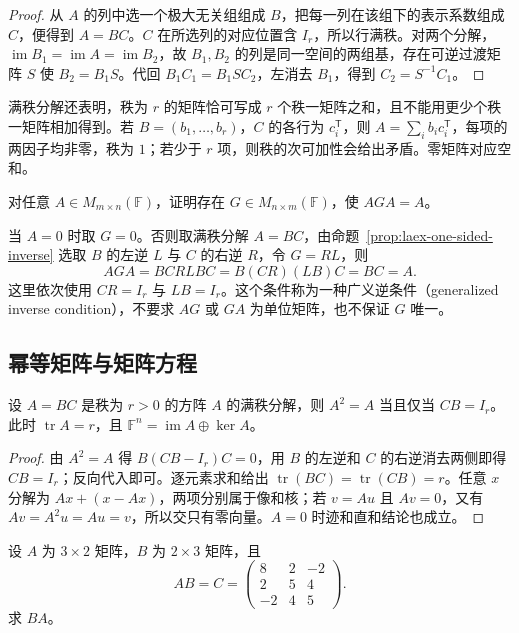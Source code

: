 \begin{proof}
从 $A$ 的列中选一个极大无关组组成 $B$，把每一列在该组下的表示系数组成 $C$，便得到 $A=BC$。$C$ 在所选列的对应位置含 $I_r$，所以行满秩。对两个分解，$\operatorname{im}B_1=\operatorname{im}A=\operatorname{im}B_2$，故 $B_1,B_2$ 的列是同一空间的两组基，存在可逆过渡矩阵 $S$ 使 $B_2=B_1S$。代回 $B_1C_1=B_1SC_2$，左消去 $B_1$，得到 $C_2=S^{-1}C_1$。
\end{proof}

满秩分解还表明，秩为 $r$ 的矩阵恰可写成 $r$ 个秩一矩阵之和，且不能用更少个秩一矩阵相加得到。若 $B=(b_1,\ldots,b_r)$，$C$ 的各行为 $c_i^{\mathsf T}$，则 $A=\sum_i b_ic_i^{\mathsf T}$，每项的两因子均非零，秩为 $1$；若少于 $r$ 项，则秩的次可加性会给出矛盾。零矩阵对应空和。

\begin{example}
\label{ex:laex-generalized-inverse}
对任意 $A\in M_{m\times n}(\mathbb F)$，证明存在 $G\in M_{n\times m}(\mathbb F)$，使 $AGA=A$。
\end{example}

\begin{solve}
当 $A=0$ 时取 $G=0$。否则取满秩分解 $A=BC$，由命题~\ref{prop:laex-one-sided-inverse} 选取 $B$ 的左逆 $L$ 与 $C$ 的右逆 $R$，令 $G=RL$，则
\[
AGA=BCRLBC=B(CR)(LB)C=BC=A.
\]
这里依次使用 $CR=I_r$ 与 $LB=I_r$。这个条件称为一种广义逆条件（generalized inverse condition），不要求 $AG$ 或 $GA$ 为单位矩阵，也不保证 $G$ 唯一。
\end{solve}

\subsection{幂等矩阵与矩阵方程}

\begin{proposition}
\label{prop:laex-idempotent-factorization}
设 $A=BC$ 是秩为 $r>0$ 的方阵 $A$ 的满秩分解，则 $A^2=A$ 当且仅当 $CB=I_r$。此时 $\operatorname{tr}A=r$，且 $\mathbb F^n=\operatorname{im}A\oplus\ker A$。
\end{proposition}

\begin{proof}
由 $A^2=A$ 得 $B(CB-I_r)C=0$，用 $B$ 的左逆和 $C$ 的右逆消去两侧即得 $CB=I_r$；反向代入即可。逐元素求和给出 $\operatorname{tr}(BC)=\operatorname{tr}(CB)=r$。任意 $x$ 分解为 $Ax+(x-Ax)$，两项分别属于像和核；若 $v=Au$ 且 $Av=0$，又有 $Av=A^2u=Au=v$，所以交只有零向量。$A=0$ 时迹和直和结论也成立。
\end{proof}

\begin{example}
\label{ex:laex-rectangular-product}
设 $A$ 为 $3\times2$ 矩阵，$B$ 为 $2\times3$ 矩阵，且
\[
AB=C=\begin{pmatrix}8&2&-2\\2&5&4\\-2&4&5\end{pmatrix}.
\]
求 $BA$。
\end{example}

